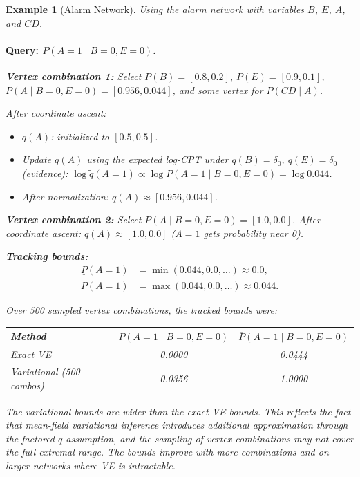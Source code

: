\documentclass[11pt]{article}
\newtheorem{example}{Example}
\begin{document}
\begin{example}[Alarm Network]
Using the alarm network with variables $B$, $E$, $A$, and $CD$.

\paragraph{Query: $P(A{=}1 \mid B{=}0, E{=}0)$.}

\textbf{Vertex combination 1:} Select $P(B) = [0.8, 0.2]$, $P(E) = [0.9, 0.1]$,
$P(A \mid B{=}0, E{=}0) = [0.956, 0.044]$, and some vertex for $P(CD \mid A)$.

After coordinate ascent:
\begin{itemize}
  \item $q(A)$: initialized to $[0.5, 0.5]$.
  \item Update $q(A)$ using the expected log-CPT under $q(B) = \delta_0$,
        $q(E) = \delta_0$ (evidence):
        $\log \tilde{q}(A{=}1) \propto \log P(A{=}1 \mid B{=}0, E{=}0) = \log 0.044$.
  \item After normalization: $q(A) \approx [0.956, 0.044]$.
\end{itemize}

\textbf{Vertex combination 2:} Select $P(A \mid B{=}0, E{=}0) = [1.0, 0.0]$.
After coordinate ascent: $q(A) \approx [1.0, 0.0]$ ($A{=}1$ gets probability near 0).

\textbf{Tracking bounds:}
\begin{align*}
  \underline{P}(A{=}1) &= \min(0.044, 0.0, \dots) \approx 0.0, \\
  \overline{P}(A{=}1) &= \max(0.044, 0.0, \dots) \approx 0.044.
\end{align*}

Over 500 sampled vertex combinations, the tracked bounds were:
\begin{center}
\begin{tabular}{lcc}
\toprule
\textbf{Method} & $\underline{P}(A{=}1 \mid B{=}0, E{=}0)$
                 & $\overline{P}(A{=}1 \mid B{=}0, E{=}0)$ \\
\midrule
Exact VE & 0.0000 & 0.0444 \\
Variational (500 combos) & 0.0356 & 1.0000 \\
\bottomrule
\end{tabular}
\end{center}

The variational bounds are wider than the exact VE bounds. This reflects
the fact that mean-field variational inference introduces additional
approximation through the factored $q$ assumption, and the sampling
of vertex combinations may not cover the full extremal range. The bounds
improve with more combinations and on larger networks where VE is
intractable.
\end{example}
\end{document}
